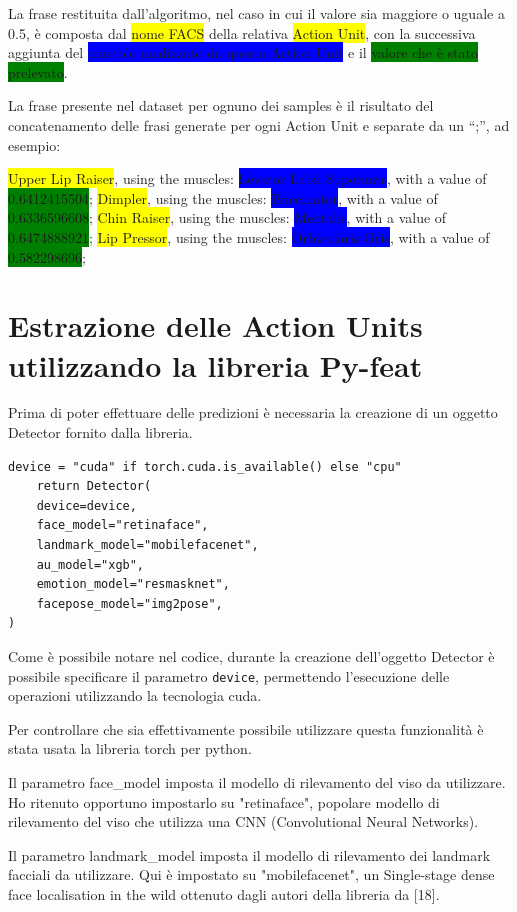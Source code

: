 La frase restituita dall’algoritmo, nel caso in cui il valore sia maggiore o uguale a 0.5, è composta dal \colorbox{yellow}{nome FACS} della relativa \colorbox{yellow}{Action Unit}, con la successiva aggiunta del \colorbox{blue}{muscolo analizzato da questa Action Unit} e il \colorbox{green}{valore che è stato prelevato}.

La frase presente nel dataset per ognuno dei samples è il risultato del concatenamento delle frasi generate per ogni Action Unit e separate da un “;”, ad esempio:

\colorbox{yellow}{Upper Lip Raiser}, using the muscles: \colorbox{blue}{Levator Labii Superioris}, with a value of \colorbox{green}{0.6412415504}; \colorbox{yellow}{Dimpler}, using the muscles: \colorbox{blue}{Buccinator}, with a value of \colorbox{green}{0.6336596608}; \colorbox{yellow}{Chin Raiser}, using the muscles: \colorbox{blue}{Mentalis}, with a value of \colorbox{green}{0.6474888921}; \colorbox{yellow}{Lip Pressor}, using the muscles: \colorbox{blue}{Orbicularis Oris}, with a value of \colorbox{green}{0.582298696};


\section{Estrazione delle Action Units utilizzando la libreria Py-feat}
Prima di poter effettuare delle predizioni è necessaria la creazione di un oggetto Detector fornito dalla libreria.
\begin{verbatim}
device = "cuda" if torch.cuda.is_available() else "cpu"
    return Detector(
    device=device,
    face_model="retinaface",
    landmark_model="mobilefacenet",
    au_model="xgb",
    emotion_model="resmasknet",
    facepose_model="img2pose",
)
\end{verbatim}
Come è possibile notare nel codice, durante la creazione dell’oggetto Detector è possibile specificare il parametro \texttt{device}, permettendo l’esecuzione delle operazioni utilizzando la tecnologia cuda. 

Per controllare che sia effettivamente possibile utilizzare questa funzionalità è stata usata la libreria torch per python.

Il parametro face\_model imposta il modello di rilevamento del viso da utilizzare. Ho ritenuto opportuno impostarlo su "retinaface", popolare modello di rilevamento del viso che utilizza una CNN (Convolutional Neural Networks).

Il parametro landmark\_model imposta il modello di rilevamento dei landmark facciali da utilizzare. Qui è impostato su "mobilefacenet", un Single-stage dense face localisation in the wild ottenuto dagli autori della libreria da [18].

